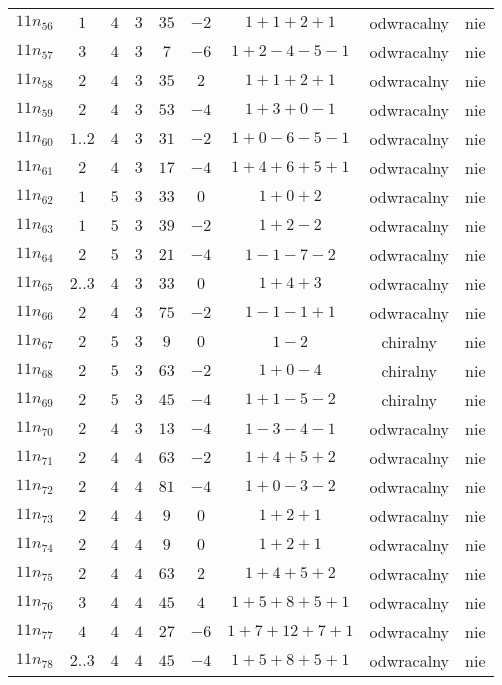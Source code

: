 \begin{longtable}{ccccccccc}
$11n_{56}$ & $1$ & $4$ & $3$ & $35$ & $-2$ & $1+1+2+1$ & odwracalny & nie \\
$11n_{57}$ & $3$ & $4$ & $3$ & $7$ & $-6$ & $1+2-4-5-1$ & odwracalny & nie \\
$11n_{58}$ & $2$ & $4$ & $3$ & $35$ & $2$ & $1+1+2+1$ & odwracalny & nie \\
$11n_{59}$ & $2$ & $4$ & $3$ & $53$ & $-4$ & $1+3+0-1$ & odwracalny & nie \\
$11n_{60}$ & $1..2$ & $4$ & $3$ & $31$ & $-2$ & $1+0-6-5-1$ & odwracalny & nie \\
$11n_{61}$ & $2$ & $4$ & $3$ & $17$ & $-4$ & $1+4+6+5+1$ & odwracalny & nie \\
$11n_{62}$ & $1$ & $5$ & $3$ & $33$ & $0$ & $1+0+2$ & odwracalny & nie \\
$11n_{63}$ & $1$ & $5$ & $3$ & $39$ & $-2$ & $1+2-2$ & odwracalny & nie \\
$11n_{64}$ & $2$ & $5$ & $3$ & $21$ & $-4$ & $1-1-7-2$ & odwracalny & nie \\
$11n_{65}$ & $2..3$ & $4$ & $3$ & $33$ & $0$ & $1+4+3$ & odwracalny & nie \\
$11n_{66}$ & $2$ & $4$ & $3$ & $75$ & $-2$ & $1-1-1+1$ & odwracalny & nie \\
$11n_{67}$ & $2$ & $5$ & $3$ & $9$ & $0$ & $1-2$ & chiralny & nie \\
$11n_{68}$ & $2$ & $5$ & $3$ & $63$ & $-2$ & $1+0-4$ & chiralny & nie \\
$11n_{69}$ & $2$ & $5$ & $3$ & $45$ & $-4$ & $1+1-5-2$ & chiralny & nie \\
$11n_{70}$ & $2$ & $4$ & $3$ & $13$ & $-4$ & $1-3-4-1$ & odwracalny & nie \\
$11n_{71}$ & $2$ & $4$ & $4$ & $63$ & $-2$ & $1+4+5+2$ & odwracalny & nie \\
$11n_{72}$ & $2$ & $4$ & $4$ & $81$ & $-4$ & $1+0-3-2$ & odwracalny & nie \\
$11n_{73}$ & $2$ & $4$ & $4$ & $9$ & $0$ & $1+2+1$ & odwracalny & nie \\
$11n_{74}$ & $2$ & $4$ & $4$ & $9$ & $0$ & $1+2+1$ & odwracalny & nie \\
$11n_{75}$ & $2$ & $4$ & $4$ & $63$ & $2$ & $1+4+5+2$ & odwracalny & nie \\
$11n_{76}$ & $3$ & $4$ & $4$ & $45$ & $4$ & $1+5+8+5+1$ & odwracalny & nie \\
$11n_{77}$ & $4$ & $4$ & $4$ & $27$ & $-6$ & $1+7+12+7+1$ & odwracalny & nie \\
$11n_{78}$ & $2..3$ & $4$ & $4$ & $45$ & $-4$ & $1+5+8+5+1$ & odwracalny & nie \\

\end{longtable}

